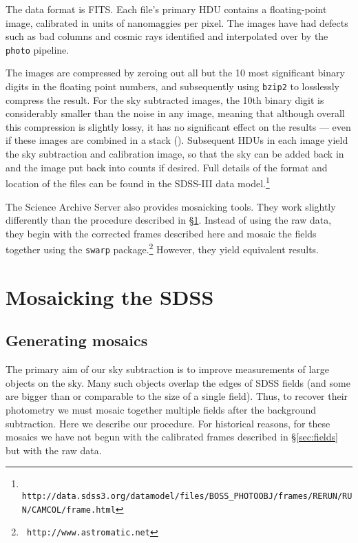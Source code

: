 \documentclass[10pt,preprint]{aastex}
\begin{document}
The data format is FITS. Each file's primary HDU contains a
floating-point image, calibrated in units of nanomaggies per
pixel. The images have had defects such as bad columns and cosmic rays
identified and interpolated over by the {\tt photo} pipeline.

The images are compressed by zeroing out all but the 10 most
significant binary digits in the floating point numbers, and
subsequently using {\tt bzip2} to losslessly compress the result. For
the sky subtracted images, the 10th binary digit is considerably
smaller than the noise in any image, meaning that although overall
this compression is slightly lossy, it has no significant effect on
the results --- even if these images are combined in a stack
(\citealt{pricewhelan10a}).  Subsequent HDUs in each image yield the
sky subtraction and calibration image, so that the sky can be added
back in and the image put back into counts if desired. Full details
of the format and location of the files can be found in the SDSS-III
data model.\footnote{\tt
  http://data.sdss3.org/datamodel/files/BOSS\_PHOTOOBJ/frames/RERUN/RUN/CAMCOL/frame.html}

The Science Archive Server also provides mosaicking tools. They work
slightly differently than the procedure described in
\S\ref{sec:mosaic}.  Instead of using the raw data, they begin with
the corrected frames described here and mosaic the fields together
using the {\tt swarp} package.\footnote{{\tt
    http://www.astromatic.net}} However, they yield equivalent
results.

\section{Mosaicking the SDSS}
\label{sec:mosaic}

\subsection{Generating mosaics}

The primary aim of our sky subtraction is to improve measurements of
large objects on the sky.  Many such objects overlap the edges of SDSS
fields (and some are bigger than or comparable to the size of a single
field).  Thus, to recover their photometry we must mosaic together
multiple fields after the background subtraction. Here we describe our
procedure. For historical reasons, for these mosaics we have not begun
with the calibrated frames described in \S\ref{sec:fields} but with
the raw data.
\end{document}
